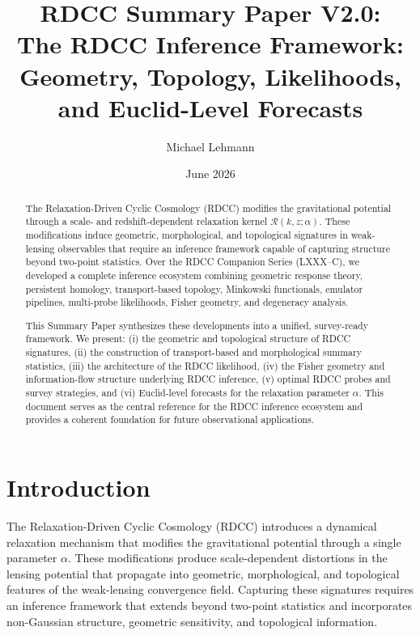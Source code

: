 \documentclass[11pt,a4paper]{article}
\title{\textbf{RDCC Summary Paper V2.0:\\
The RDCC Inference Framework: Geometry, Topology, Likelihoods,\\
and Euclid-Level Forecasts}}
\author[1]{Michael Lehmann}
\affil[1]{\small Independent Researcher, Relaxation-Driven Cyclic Cosmology (RDCC) Framework\\
\texttt{mi.lehmann@gmx.de}}
\date{\small June 2026}
\begin{document}
\maketitle


\begin{abstract}
The Relaxation-Driven Cyclic Cosmology (RDCC) modifies the gravitational potential
through a scale- and redshift-dependent relaxation kernel $\mathcal{R}(k,z;\alpha)$.
These modifications induce geometric, morphological, and topological signatures in
weak-lensing observables that require an inference framework capable of capturing
structure beyond two-point statistics. Over the RDCC Companion Series (LXXX--C),
we developed a complete inference ecosystem combining geometric response theory,
persistent homology, transport-based topology, Minkowski functionals, emulator
pipelines, multi-probe likelihoods, Fisher geometry, and degeneracy analysis.

This Summary Paper synthesizes these developments into a unified, survey-ready
framework. We present: (i) the geometric and topological structure of RDCC
signatures, (ii) the construction of transport-based and morphological summary
statistics, (iii) the architecture of the RDCC likelihood, (iv) the Fisher geometry
and information-flow structure underlying RDCC inference, (v) optimal RDCC probes
and survey strategies, and (vi) Euclid-level forecasts for the relaxation parameter
$\alpha$. This document serves as the central reference for the RDCC inference
ecosystem and provides a coherent foundation for future observational applications.
\end{abstract}


\section{Introduction}

The Relaxation-Driven Cyclic Cosmology (RDCC) introduces a dynamical relaxation
mechanism that modifies the gravitational potential through a single parameter
$\alpha$. These modifications produce scale-dependent distortions in the lensing
potential that propagate into geometric, morphological, and topological features
of the weak-lensing convergence field. Capturing these signatures requires an
inference framework that extends beyond two-point statistics and incorporates
non-Gaussian structure, geometric sensitivity, and topological information.
\end{document}
